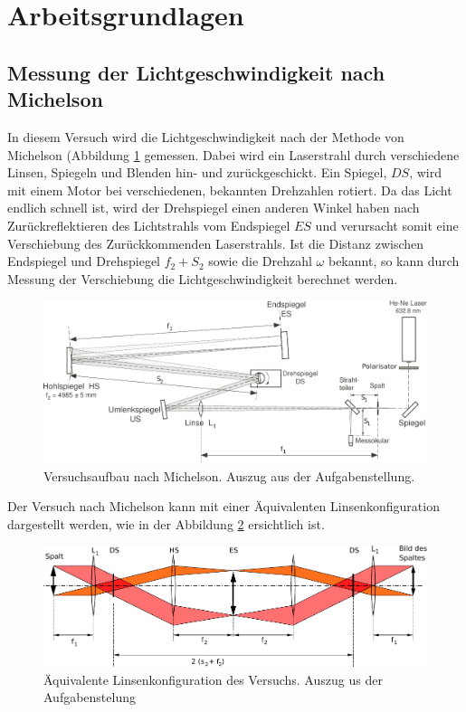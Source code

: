 \section{Arbeitsgrundlagen}


\subsection{Messung der Lichtgeschwindigkeit nach Michelson}

In diesem Versuch wird die Lichtgeschwindigkeit nach der Methode von Michelson
(Abbildung  \ref{fig:michelson}  gemessen. Dabei  wird ein  Laserstrahl  durch
verschiedene  Linsen, Spiegeln  und  Blenden  hin- und  zur\"uckgeschickt. Ein
Spiegel, $DS$,  wird mit einem  Motor bei verschiedenen,  bekannten Drehzahlen
rotiert.  Da das Licht endlich schnell ist, wird der Drehspiegel einen anderen
Winkel haben  nach Zur\"uckreflektieren  des Lichtstrahls vom  Endspiegel $ES$
und verursacht somit eine Verschiebung des Zur\"uckkommenden Laserstrahls. Ist
die  Distanz  zwischen  Endspiegel  und  Drehspiegel $f_2  +  S_2$  sowie  die
Drehzahl  $\omega$  bekannt,  so  kann  durch  Messung  der  Verschiebung  die
Lichtgeschwindigkeit berechnet werden.

\begin{figure}[H]
    \center
    \includegraphics[width=\textwidth]{svg/michelson.pdf}
    \caption{Versuchsaufbau nach Michelson. Auszug aus der Aufgabenstellung.}
    \label{fig:michelson}
\end{figure}

Der Versuch  nach Michelson kann mit  einer \"Aquivalenten Linsenkonfiguration
dargestellt werden,  wie in  der Abbildung  \ref{fig:linsenkonfig} ersichtlich
ist.

\begin{figure}[H]
    \center
    \includegraphics[width=\textwidth]{svg/linsenkonfig.pdf}
    \caption{\"Aquivalente Linsenkonfiguration des Versuchs. Auszug us der Aufgabenstelung}
    \label{fig:linsenkonfig}
\end{figure}


